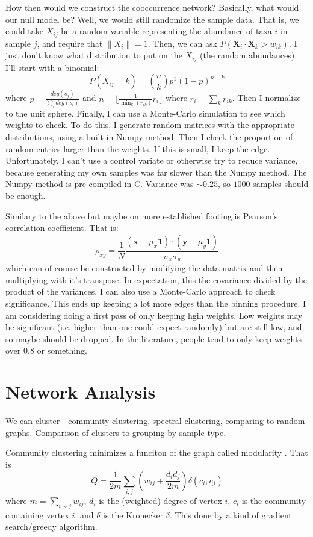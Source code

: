 \documentclass[10pt]{article}
\theoremstyle{definition}
\numberwithin{theorem}{section}
\numberwithin{definition}{section}
\numberwithin{lemma}{section}
\numberwithin{corollary}{section}
\numberwithin{clm}{section}
\numberwithin{rmk}{section}
\renewcommand{\b}{\bm}
\begin{document}
How then would we construct the cooccurrence network? Basically, what would our null model be? Well, we would still randomize the sample data. That is, we could take $X_{ij}$ be a random variable representing the abundance of taxa $i$ in sample $j$, and require that $\|X_{i}\| = 1$. Then, we can ask $P(\b{X}_i \cdot \b{X}_k > w_{ik})$. I just don't know what distribution to put on the $X_{ij}$ (the random abundances). I'll start with a binomial:
\[
P(\tilde{X}_{ij} = k) = \binom{n}{k}p^1(1-p)^{n-k}
\]
where $p = \frac{\mathit{deg}(s_j)}{\sum_l \mathit{deg}(s_l)}$ and $n =\lfloor \frac{1}{\min_{k}(r_{ik})}r_i\rfloor$ where $r_i = \sum_k r_{ik}$. Then I normalize to the unit sphere.  Finally, I can use a Monte-Carlo simulation to see which weights to check. To do this, I generate random matrices with the appropriate distributions, using a built in Numpy method. Then I check the proportion of random entries larger than the weights. If this is small, I keep the edge. Unfortunately, I can't use a control variate or otherwise try to reduce variance, because generating my own samples was far slower than the Numpy method. The Numpy method is pre-compiled in C. Variance was $\sim 0.25$, so $1000$ samples should be enough. 

Similary to the above but maybe on more established footing is Pearson's correlation coefficient. That is:
\[
\rho_{xy} = \frac{1}{N}\frac{(\b{x}- \mu_x\b{1}) \cdot (\b{y} - \mu_y\b{1})}{\sigma_x \sigma_y}
\]
which can of course be constructed by modifying the data matrix and then multiplying with it's transpose. In expectation, this the covariance divided by the product of the variances. I can also use a Monte-Carlo approach to check significance.
This ends up keeping a lot more edges than the binning procedure. I am considering doing a first pass of only keeping hgih weights. Low weights may be significant (i.e. higher than one could expect randomly) but are still low, and so maybe should be dropped. In the literature, people tend to only keep weights over $0.8$ or something.


\section{Network Analysis}
We can cluster - community clustering, spectral clustering, comparing to random graphs. Comparison of clusters to grouping by sample type.

Community clustering minimizes a funciton of the graph called modularity \cite{PhysRevE.70.066111}\cite{PhysRevE.70.056131}. That is 
\[
Q = \frac{1}{2m}\sum_{i,j}\left(w_{ij} + \frac{d_id_j}{2m}\right) \delta(c_i,c_j)
\]
where $m = \sum_{i\sim j} w_{ij}$, $d_i$ is the (weighted) degree of vertex $i$, $c_i$ is the community containing vertex $i$, and $\delta$ is the Kronecker $\delta$. This done by a kind of gradient search/greedy algorithm.
\end{document}
